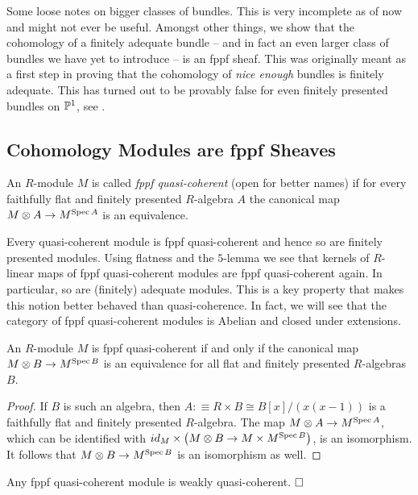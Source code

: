 
Some loose notes on bigger classes of bundles.
This is very incomplete as of now and might not ever be useful.
Amongst other things, we show that the cohomology of a finitely adequate bundle -- and in fact an even larger class of bundles we have yet to introduce -- is an fppf sheaf.
This was originally meant as a first step in proving that the cohomology of \emph{nice enough} bundles is finitely adequate.
This has turned out to be provably false for even finitely presented bundles on $\mathbb{P}^1$, see .

\subsection{Cohomology Modules are fppf Sheaves}

\begin{definition}
  An $R$-module $M$ is called \emph{fppf quasi-coherent} {\color{red}(open for better names)} if for every faithfully flat and finitely presented $R$-algebra $A$ the canonical map $M \otimes A \to M^{\operatorname{Spec} A}$ is an equivalence.
\end{definition}

Every quasi-coherent module is fppf quasi-coherent and hence so are finitely presented modules.
Using flatness and the $5$-lemma we see that kernels of $R$-linear maps of fppf quasi-coherent modules are fppf quasi-coherent again.
In particular, so are (finitely) adequate modules.
This is a key property that makes this notion better behaved than quasi-coherence.
In fact, we will see that the category of fppf quasi-coherent modules is Abelian and closed under extensions.

\begin{lemma}
  An $R$-module $M$ is fppf quasi-coherent if and only if the canonical map $M \otimes B \to M^{\operatorname{Spec} B}$ is an equivalence for all flat and finitely presented $R$-algebras $B$.
\end{lemma}

\begin{proof}
  If $B$ is such an algebra, then $A : \equiv R \times B \cong B[x]/(x(x-1))$ is a faithfully flat and finitely presented $R$-algebra.
  The map $M \otimes A \to M^{\operatorname{Spec} A}$, which can be identified with $id_M \times \big( M \otimes B \to M \times M^{\operatorname{Spec} B} \big)$, is an isomorphism.
  It follows that $M \otimes B \to M^{\operatorname{Spec} B}$ is an isomorphism as well.
\end{proof}

\begin{corollary}
  \label{fppf-qc-implies-wqc}
  Any fppf quasi-coherent module is weakly quasi-coherent.
  $\hfill\square$
\end{corollary}


